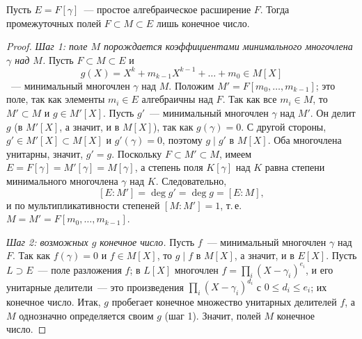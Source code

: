 \begin{proposition}[5.3]
Пусть $E=F[\gamma]$~--- простое алгебраическое расширение $F$. Тогда промежуточных полей $F\subset M\subset E$ лишь
конечное число.
\end{proposition}

\begin{proof}
\emph{Шаг 1: поле $M$ порождается коэффициентами минимального многочлена $\gamma$ над $M$.} Пусть $F\subset M\subset E$ и
\[
g(X)=X^k+m_{k-1}X^{k-1}+\dots+m_0\in M[X]
\]
~--- минимальный многочлен $\gamma$ над $M$. Положим $M'=F[m_0,\dots,m_{k-1}]$; это поле, так как элементы $m_i\in E$
алгебраичны над $F$. Так как все $m_i\in M$, то $M'\subset M$ и
$g\in M'[X]$. Пусть $g'$~--- минимальный многочлен $\gamma$ над $M'$. Он делит $g$ (в $M'[X]$, а значит, и в $M[X]$),
так как $g(\gamma)=0$. С другой стороны, $g'\in M'[X]\subset M[X]$ и $g'(\gamma)=0$, поэтому $g\mid g'$ в $M[X]$. Оба
многочлена унитарны, значит, $g'=g$. Поскольку $F\subset M'\subset M$, имеем $E=F[\gamma]=M'[\gamma]=M[\gamma]$, а
степень поля $K[\gamma]$ над $K$ равна степени минимального многочлена $\gamma$ над $K$. Следовательно,
\[
[E:M']=\deg g'=\deg g=[E:M],
\]
и по мультипликативности степеней $[M:M']=1$, т.\,е.\ $M=M'=F[m_0,\dots,m_{k-1}]$.
\begin{keepfig}
\begin{center}
\end{center}
\end{keepfig}

\emph{Шаг 2: возможных $g$ конечное число.} Пусть $f$~--- минимальный многочлен $\gamma$ над $F$. Так как $f(\gamma)=0$
и $f\in M[X]$, то $g\mid f$ в $M[X]$, а значит, и в $E[X]$. Пусть $L\supset E$~--- поле разложения $f$; в $L[X]$
многочлен $f=\prod_i(X-\gamma_i)^{e_i}$, и его унитарные делители~--- это произведения $\prod_i(X-\gamma_i)^{d_i}$ с
$0\le d_i\le e_i$; их конечное число. Итак, $g$ пробегает конечное множество унитарных делителей $f$, а $M$ однозначно
определяется своим $g$ (шаг 1). Значит, полей $M$ конечное число.
\end{proof}

